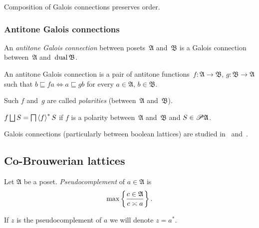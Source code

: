 \begin{obvious}
Composition of Galois connections preserves order.
\end{obvious}

\subsubsection{Antitone Galois connections}

\begin{defn}
An \emph{antitone Galois connection} between posets~$\mathfrak{A}$ and~$\mathfrak{B}$ is a Galois connection
between~$\mathfrak{A}$ and~$\operatorname{dual}\mathfrak{B}$.
\end{defn}

\begin{obvious}
An antitone Galois connection is a pair of antitone functions~$f:\mathfrak{A}\rightarrow\mathfrak{B}$, $g:\mathfrak{B}\rightarrow\mathfrak{A}$
such that $b\sqsubseteq fa \Leftrightarrow a\sqsubseteq gb$ for every $a\in\mathfrak{A}$, $b\in\mathfrak{B}$.
\end{obvious}

Such $f$ and~$g$ are called \emph{polarities} (between~$\mathfrak{A}$ and~$\mathfrak{B}$).

\begin{obvious}\label{polar-flip}
$f\bigsqcup S = \bigsqcap \rsupfun{f}S$ if $f$ is a polarity between~$\mathfrak{A}$ and~$\mathfrak{B}$ and $S\in\mathscr{P}\mathfrak{A}$.
\end{obvious}

Galois connections (particularly between boolean lattices) are studied in~\cite{tprod-dist-lat}
and~\cite{shmuely1974}.

\subsection{Co-Brouwerian lattices}
\begin{defn}
Let $\mathfrak{A}$ be a poset. \emph{Pseudocomplement}
of $a\in\mathfrak{A}$ is
\[
\max\left\{ \frac{c\in\mathfrak{A}}{c\asymp a}\right\}.
\]


If $z$ is the pseudocomplement of $a$ we will denote $z=a^{\ast}$.
\end{defn}

